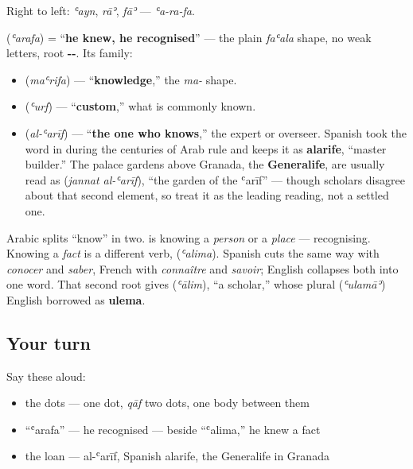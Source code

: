 Right to left: \emph{ʿayn}, \emph{rāʾ}, \emph{fāʾ} — \emph{ʿa-ra-fa}.

\begin{cousinweb}
\textbf{} (\emph{ʿarafa}) = \textquotedblleft{}\textbf{he knew, he recognised}\textquotedblright{} — the plain \emph{faʿala} shape, no weak letters, root \textbf{--}. Its family:

\begin{itemize}
\raggedright
  \item \textbf{} (\emph{maʿrifa}) — \textquotedblleft{}\textbf{knowledge},\textquotedblright{} the \emph{ma-} shape.
  \item \textbf{} (\emph{ʿurf}) — \textquotedblleft{}\textbf{custom},\textquotedblright{} what is commonly known.
  \item \textbf{} (\emph{al-ʿarīf}) — \textquotedblleft{}\textbf{the one who knows},\textquotedblright{} the expert or overseer. Spanish took the word in during the centuries of Arab rule and keeps it as \textbf{alarife}, \textquotedblleft{}master builder.\textquotedblright{} The palace gardens above Granada, the \textbf{Generalife}, are usually read as \textbf{ } (\emph{jannat al-ʿarīf}), \textquotedblleft{}the garden of the ʿarīf\textquotedblright{} — though scholars disagree about that second element, so treat it as the leading reading, not a settled one.
\end{itemize}

Arabic splits \textquotedblleft{}know\textquotedblright{} in two. \textbf{} is knowing a \emph{person} or a \emph{place} — recognising. Knowing a \emph{fact} is a different verb, \textbf{} (\emph{ʿalima}). Spanish cuts the same way with \emph{conocer} and \emph{saber}, French with \emph{connaître} and \emph{savoir}; English collapses both into one word. That second root gives \textbf{} (\emph{ʿālim}), \textquotedblleft{}a scholar,\textquotedblright{} whose plural \textbf{} (\emph{ʿulamāʾ}) English borrowed as \textbf{ulema}.
\end{cousinweb}

\subsection*{Your turn}
Say these aloud:

\begin{itemize}
\raggedright
  \item the dots —  one dot, \emph{qāf} two dots, one body between them
  \item \textquotedblleft{}ʿarafa\textquotedblright{} — he recognised — beside \textquotedblleft{}ʿalima,\textquotedblright{} he knew a fact
  \item the loan — al-ʿarīf, Spanish alarife, the Generalife in Granada
\end{itemize}

